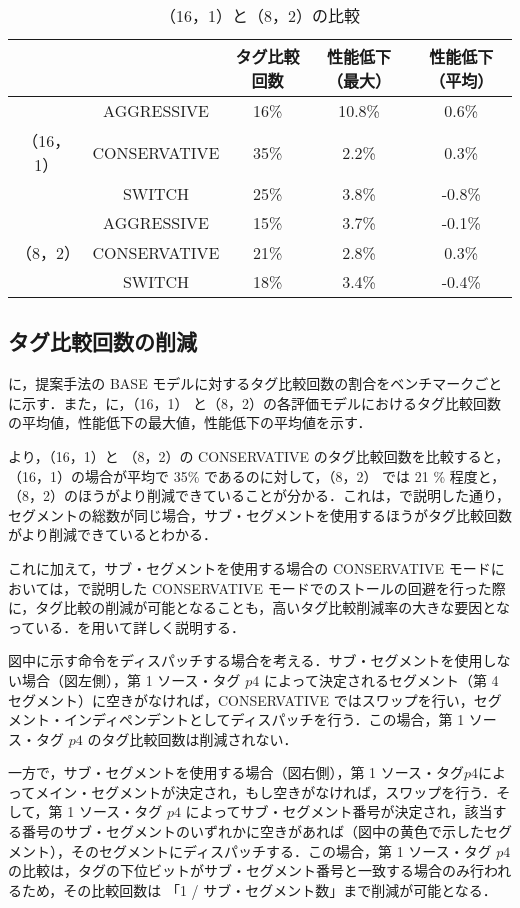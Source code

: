 \begin{table}[htb]
  \caption{（16，1）と（8，2）の比較}
  \footnotesize
  \center
    \begin{tabular}{cc|c|c|c} \hline \hline
     & & タグ比較回数 & 性能低下（最大） & 性能低下（平均）\\\hline
     & AGGRESSIVE  & 16\%  & 10.8\% & 0.6\% \\
    （16，1） & CONSERVATIVE & 35\% & 2.2\% & 0.3\% \\ \
     & SWITCH & 25\% & 3.8\% & -0.8\% \\ \hline
     & AGGRESSIVE & 15\% & 3.7\% & -0.1\% \\
    （8，2） & CONSERVATIVE & 21\% & 2.8\% & 0.3\% \\ 
     & SWITCH & 18\% & 3.4\% & -0.4\% \\ \hline
  \end{tabular}
  \label{tab:subseg_eval}
\end{table}

\subsection{タグ比較回数の削減}
に，提案手法の BASE モデルに対するタグ比較回数の割合をベンチマークごとに示す．また，に，（16，1） と（8，2）の各評価モデルにおけるタグ比較回数の平均値，性能低下の最大値，性能低下の平均値を示す．

 より，（16，1）と （8，2）の CONSERVATIVE のタグ比較回数を比較すると，（16，1）の場合が平均で 35\% であるのに対して，（8，2） では 21 \% 程度と，（8，2）のほうがより削減できていることが分かる．これは，で説明した通り，セグメントの総数が同じ場合，サブ・セグメントを使用するほうがタグ比較回数がより削減できているとわかる．

これに加えて，サブ・セグメントを使用する場合の CONSERVATIVE モードにおいては，で説明した CONSERVATIVE モードでのストールの回避を行った際に，タグ比較の削減が可能となることも，高いタグ比較削減率の大きな要因となっている．を用いて詳しく説明する．

図中に示す命令をディスパッチする場合を考える．サブ・セグメントを使用しない場合（図左側），第 1 ソース・タグ $p4$ によって決定されるセグメント（第 4 セグメント）に空きがなければ，CONSERVATIVE ではスワップを行い，セグメント・インディペンデントとしてディスパッチを行う．この場合，第 1 ソース・タグ $p4$ のタグ比較回数は削減されない．

一方で，サブ・セグメントを使用する場合（図右側），第 1 ソース・タグ$p4$によってメイン・セグメントが決定され，もし空きがなければ，スワップを行う．そして，第 1 ソース・タグ $p4$ によってサブ・セグメント番号が決定され，該当する番号のサブ・セグメントのいずれかに空きがあれば（図中の黄色で示したセグメント），そのセグメントにディスパッチする．この場合，第 1 ソース・タグ $p4$ の比較は，タグの下位ビットがサブ・セグメント番号と一致する場合のみ行われるため，その比較回数は 「1 / サブ・セグメント数」まで削減が可能となる．


